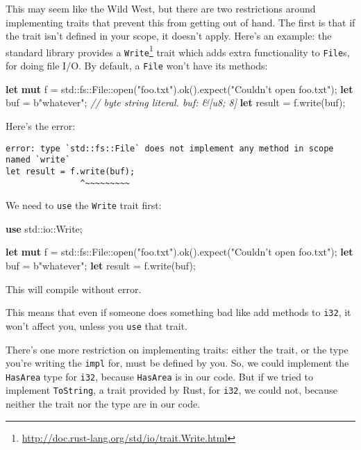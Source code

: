 \documentclass[a4paper,]{book}
\newenvironment{Shaded}{\begin{snugshade}}{\end{snugshade}}
\newcommand{\KeywordTok}[1]{\textcolor[rgb]{0.13,0.29,0.53}{\textbf{{#1}}}}
\newcommand{\StringTok}[1]{\textcolor[rgb]{0.31,0.60,0.02}{{#1}}}
\newcommand{\CommentTok}[1]{\textcolor[rgb]{0.56,0.35,0.01}{\textit{{#1}}}}
\newcommand{\NormalTok}[1]{{#1}}
\renewcommand{\href}[2]{#2\footnote{\url{#1}}}
\begin{document}
This may seem like the Wild West, but there are two restrictions around
implementing traits that prevent this from getting out of hand. The
first is that if the trait isn't defined in your scope, it doesn't
apply. Here's an example: the standard library provides a
\href{http://doc.rust-lang.org/std/io/trait.Write.html}{\texttt{Write}}
trait which adds extra functionality to \texttt{File}s, for doing file
I/O. By default, a \texttt{File} won't have its methods:

\begin{Shaded}
\begin{Highlighting}[]
\KeywordTok{let} \KeywordTok{mut} \NormalTok{f = std::fs::File::open(}\StringTok{"foo.txt"}\NormalTok{).ok().expect(}\StringTok{"Couldn’t open foo.txt"}\NormalTok{);}
\KeywordTok{let} \NormalTok{buf = b}\StringTok{"whatever"}\NormalTok{; }\CommentTok{// byte string literal. buf: &[u8; 8]}
\KeywordTok{let} \NormalTok{result = f.write(buf);}
\end{Highlighting}
\end{Shaded}

Here's the error:

\begin{verbatim}
error: type `std::fs::File` does not implement any method in scope named `write`
let result = f.write(buf);
               ^~~~~~~~~~
\end{verbatim}

We need to \texttt{use} the \texttt{Write} trait first:

\begin{Shaded}
\begin{Highlighting}[]
\KeywordTok{use} \NormalTok{std::io::Write;}

\KeywordTok{let} \KeywordTok{mut} \NormalTok{f = std::fs::File::open(}\StringTok{"foo.txt"}\NormalTok{).ok().expect(}\StringTok{"Couldn’t open foo.txt"}\NormalTok{);}
\KeywordTok{let} \NormalTok{buf = b}\StringTok{"whatever"}\NormalTok{;}
\KeywordTok{let} \NormalTok{result = f.write(buf);}
\end{Highlighting}
\end{Shaded}

This will compile without error.

This means that even if someone does something bad like add methods to
\texttt{i32}, it won't affect you, unless you \texttt{use} that trait.

There's one more restriction on implementing traits: either the trait,
or the type you're writing the \texttt{impl} for, must be defined by
you. So, we could implement the \texttt{HasArea} type for \texttt{i32},
because \texttt{HasArea} is in our code. But if we tried to implement
\texttt{ToString}, a trait provided by Rust, for \texttt{i32}, we could
not, because neither the trait nor the type are in our code.
\end{document}
